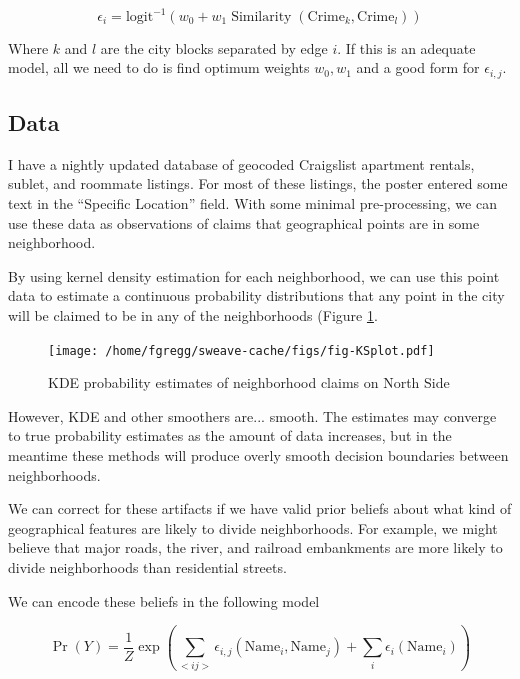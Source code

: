 \documentclass{article}
\begin{document}
\begin{equation}
\epsilon_i = \operatorname{logit^{-1}}(w_0 + w_1\operatorname{Similarity}(\text{Crime}_k, \text{Crime}_l))
\end{equation}

Where $k$ and $l$ are the city blocks separated by edge $i$. If this is an adequate model, all we need to do is find optimum weights $w_0, w_1$ and a good form for $\epsilon_{i,j}$.

\subsection*{Data}

I have a nightly updated database of geocoded Craigslist apartment
rentals, sublet, and roommate listings. For most of these listings,
the poster entered some text in the ``Specific Location'' field. With
some minimal pre-processing, we can use these data as observations of
claims that geographical points are in some neighborhood.

By using kernel density estimation for each neighborhood, we can use
this point data to estimate a continuous probability distributions
that any point in the city will be claimed to be in any of the
neighborhoods (Figure \ref{fig:KDE}.

\begin{figure}
\texttt{[image: /home/fgregg/sweave-cache/figs/fig-KSplot.pdf]}
\caption{KDE probability estimates of neighborhood claims on North Side}
\label{fig:KDE}
\end{figure}

However, KDE and other smoothers are... smooth. The estimates may
converge to true probability estimates as the amount of data
increases, but in the meantime these methods will produce overly
smooth decision boundaries between neighborhoods. 

We can correct for these artifacts if we have valid prior beliefs
about what kind of geographical features are likely to divide
neighborhoods. For example, we might believe that major roads, the
river, and railroad embankments are more likely to divide
neighborhoods than residential streets. 

We can encode these beliefs in the following model

\begin{equation}
\Pr(Y) = \frac{1}{Z}\operatorname{exp}\left(\sum_{<i j>}\epsilon_{i,j}(\text{Name}_i,\text{Name}_j) + \sum_i\epsilon_i(\text{Name}_i)\right) 
\end{equation}
\end{document}

